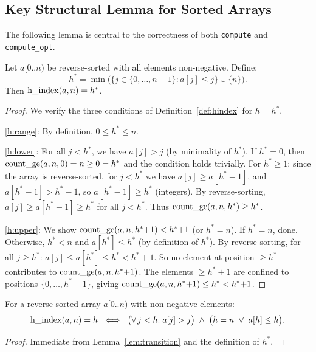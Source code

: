 \subsection{Key Structural Lemma for Sorted Arrays}

The following lemma is central to the correctness of both \texttt{compute} and \texttt{compute\_opt}.

\begin{lemma}\label{lem:transition}
Let $a[0..n)$ be reverse-sorted with all elements non-negative. Define:
\[
  h^* = \min\bigl(\{j \in \{0,\ldots,n{-}1\} : a[j] \leq j\} \cup \{n\}\bigr).
\]
Then $\operatorname{h\_index}(a,n) = h^*$.
\end{lemma}
\begin{proof}
We verify the three conditions of Definition~\ref{def:hindex} for $h = h^*$.

\ref{h:range}: By definition, $0 \leq h^* \leq n$.

\ref{h:lower}: For all $j < h^*$, we have $a[j] > j$ (by minimality of $h^*$).
If $h^* = 0$, then $\operatorname{count\_ge}(a, n, 0) = n \geq 0 = h^*$ and the condition holds trivially.
For $h^* \geq 1$: since the array is reverse-sorted, for $j < h^*$ we have
$a[j] \geq a[h^*{-}1]$, and $a[h^*{-}1] > h^*{-}1$, so $a[h^*{-}1] \geq h^*$ (integers).
By reverse-sorting, $a[j] \geq a[h^*{-}1] \geq h^*$ for all $j < h^*$.
Thus $\operatorname{count\_ge}(a, n, h^*) \geq h^*$.

\ref{h:upper}: We show $\operatorname{count\_ge}(a, n, h^*{+}1) < h^*{+}1$ (or $h^* = n$).
If $h^* = n$, done. Otherwise, $h^* < n$ and $a[h^*] \leq h^*$ (by definition of $h^*$).
By reverse-sorting, for all $j \geq h^*$: $a[j] \leq a[h^*] \leq h^* < h^*{+}1$.
So no element at position $\geq h^*$ contributes to $\operatorname{count\_ge}(a,n,h^*{+}1)$.
The elements $\geq h^*{+}1$ are confined to positions $\{0,\ldots,h^*{-}1\}$, giving
$\operatorname{count\_ge}(a,n,h^*{+}1) \leq h^* < h^*{+}1$.
\end{proof}

\begin{corollary}\label{cor:transition-equiv}
For a reverse-sorted array $a[0..n)$ with non-negative elements:
\[
  \operatorname{h\_index}(a,n) = h \;\iff\;
  \bigl(\forall\, j < h.\; a[j] > j\bigr) \;\wedge\;
  \bigl(h = n \;\vee\; a[h] \leq h\bigr).
\]
\end{corollary}
\begin{proof}
Immediate from Lemma~\ref{lem:transition} and the definition of $h^*$.
\end{proof}
